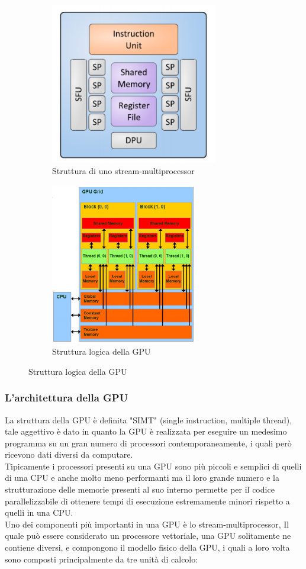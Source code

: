 \documentclass[10pt,a4paper]{article}
\begin{document}
\begin{figure}[h!]
  \centering
  \begin{subfigure}[t]{0.45\linewidth}
  	\centering
    \includegraphics[height=200pt]{SM.PNG}
    \caption*{Struttura di uno stream-multiprocessor}
  \end{subfigure}
  \begin{subfigure}[t]{0.45\linewidth}
  	\centering
    \includegraphics[height=200pt]{LogicModel.PNG}
    \caption*{Struttura logica della GPU}
  \end{subfigure}
  \label{fig:graph1}
\end{figure}

\subsubsection{L'architettura della GPU}
La struttura della GPU è definita "SIMT" (single instruction, multiple thread), tale aggettivo è dato in quanto la GPU è realizzata per eseguire un medesimo programma su un gran numero di processori contemporaneamente, i quali però ricevono dati diversi da computare.\\ Tipicamente i processori presenti su una GPU sono più piccoli e semplici di quelli di una CPU e anche molto meno performanti ma il loro grande numero e la strutturazione delle memorie presenti al suo interno permette per il codice parallelizzabile di ottenere tempi di esecuzione estremamente minori rispetto a quelli in una CPU.\\
Uno dei componenti più importanti in una GPU è lo stream-multiprocessor, Il quale  può essere considerato un processore vettoriale, una GPU solitamente ne contiene diversi, e compongono il modello fisico della GPU, i quali a loro volta sono composti principalmente da tre  unità di calcolo: 
\end{document}
